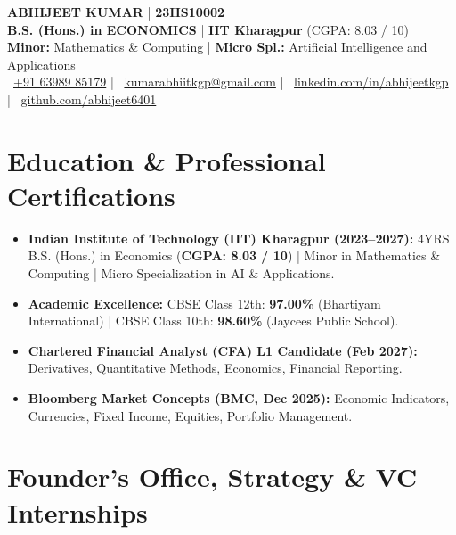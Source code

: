 \documentclass[10pt, a4paper]{article}
\begin{document}
\begin{center}
  {\LARGE \textbf{ABHIJEET KUMAR}} \quad | \quad \textbf{23HS10002} \\[3pt]
  \textbf{B.S. (Hons.) in ECONOMICS} \quad | \quad \textbf{IIT Kharagpur} (CGPA: 8.03 / 10) \\[2pt]
  \small \textbf{Minor:} Mathematics \& Computing \quad | \quad \textbf{Micro Spl.:} Artificial Intelligence and Applications \\[3pt]
  \small
  \faPhone\ \href{tel:+916398985179}{+91 63989 85179} \quad | \quad
  \faEnvelope\ \href{mailto:kumarabhiitkgp@gmail.com}{kumarabhiitkgp@gmail.com} \quad | \quad
  \faLinkedin\ \href{https://linkedin.com/in/abhijeetkgp}{linkedin.com/in/abhijeetkgp} \quad | \quad
  \faGithub\ \href{https://github.com/abhijeet6401}{github.com/abhijeet6401}
\end{center}

\vspace{-4pt}

\section{Education \& Professional Certifications}
\begin{itemize}[leftmargin=1.2em, itemsep=0.5pt, parsep=0pt, topsep=1pt]
  \small
  \item \textbf{Indian Institute of Technology (IIT) Kharagpur (2023--2027):} 4YRS B.S. (Hons.) in Economics (\textbf{CGPA: 8.03 / 10}) | Minor in Mathematics \& Computing | Micro Specialization in AI \& Applications.
  \item \textbf{Academic Excellence:} CBSE Class 12th: \textbf{97.00\%} (Bhartiyam International) | CBSE Class 10th: \textbf{98.60\%} (Jaycees Public School).
  \item \textbf{Chartered Financial Analyst (CFA) L1 Candidate (Feb 2027):} Derivatives, Quantitative Methods, Economics, Financial Reporting.
  \item \textbf{Bloomberg Market Concepts (BMC, Dec 2025):} Economic Indicators, Currencies, Fixed Income, Equities, Portfolio Management.
\end{itemize}

\vspace{-2pt}

\section{Founder's Office, Strategy \& VC Internships}
\end{document}
